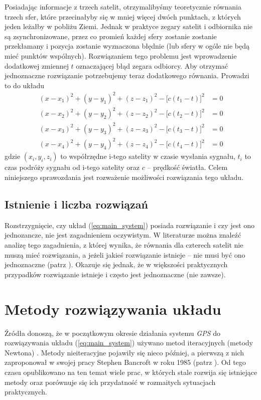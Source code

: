 \documentclass{article}
\begin{document}
Posiadając informacje z trzech satelit, otrzymalibyśmy teoretycznie równania trzech sfer, które przecinałyby się w
mniej więcej dwóch punktach, z których jeden leżałby w pobliżu Ziemi. Jednak w praktyce zegary satelit i odbiornika
nie są zsynchronizowane, przez co promień każdej sfery zostanie zostanie przekłamany i pozycja zostanie wyznaczona błędnie
(lub sfery w ogóle nie będą mieć punktów wspólnych). Rozwiązaniem tego problemu jest wprowadzenie dodatkowej zmiennej $t$
oznaczającej błąd zegara odbiorcy. Aby otrzymać jednoznaczne rozwiązanie potrzebujemy teraz dodatkowego równania.
Prowadzi to do układu
\begin{equation} \label{eq:main_system}
\begin{aligned}
    (x-x_1)^2 + (y-y_1)^2 + (z-z_1)^2 - \big[c(t_1-t)\big]^2 &= 0 \\
    (x-x_2)^2 + (y-y_2)^2 + (z-z_2)^2 - \big[c(t_2-t)\big]^2 &= 0 \\
    (x-x_3)^2 + (y-y_3)^2 + (z-z_3)^2 - \big[c(t_3-t)\big]^2 &= 0 \\
    (x-x_4)^2 + (y-y_4)^2 + (z-z_4)^2 - \big[c(t_4-t)\big]^2 &= 0
\end{aligned}
\end{equation}
gdzie $(x_i, y_i, z_i)$ to współrzędne i-tego satelity w czasie wysłania sygnału, $t_i$ to czas podróży sygnału od
i-tego satelity oraz $c$ -- prędkość światła.
Celem niniejszego sprawozdania jest rozważenie możliwości rozwiązania tego układu.

\subsection{Istnienie i liczba rozwiązań} \label{existance}
Rozstrzygnięcie, czy układ (\ref{eq:main_system}) posiada rozwiązanie i czy jest ono jednozancze, nie jest
zagadnieniem oczywistym. W literaturze można znaleźć analizę tego zagadnienia, z której wynika, że równania dla
czterech satelit nie muszą mieć rozwiązania, a jeżeli jakieś rozwiązanie istnieje -- nie musi być ono jednoznaczne
(patrz \cite{existance}). Okazuje się jednak, że w większości praktycznych przypadków rozwiązanie istnieje i często
jest jednoznaczne (nie zawsze).

\section{Metody rozwiązywania układu} \label{methods}
Źródła donoszą, że w początkowym okresie działania systemu \textit{GPS} do rozwiązywania układu (\ref{eq:main_system})
używano metod iteracyjnych (metody Newtona) \cite{origins}. Metody nieiteracyjne pojawiły się nieco później, a pierwszą z nich
zaproponował w swojej pracy Stephen Bancroft w roku 1985 (patrz \cite{bancroft}). Od tego czasu opublikowano na ten temat wiele prac, w których
stale rozwija się istniejące metody oraz porównuje się ich przydatność w rozmaitych sytuacjach praktycznych.
\end{document}

